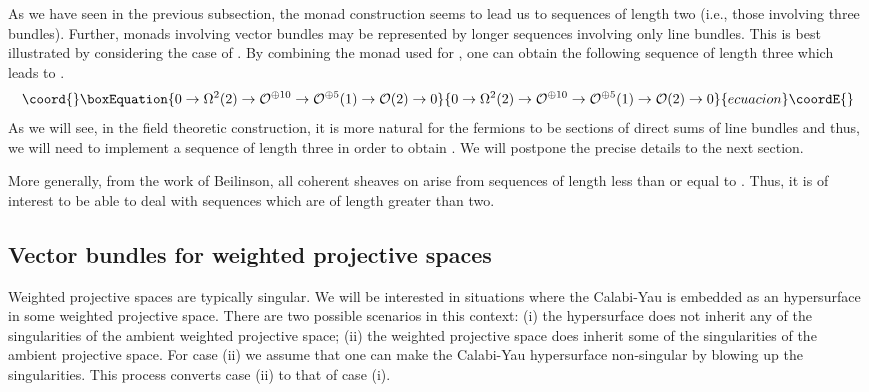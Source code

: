 \documentclass[a4paper,12pt]{article}
\begin{document}
As we have seen in the previous subsection, the monad construction
seems to lead us to sequences of length two (i.e., those involving
three bundles). Further, monads involving vector bundles may be
represented by longer sequences involving only line bundles. This is
best illustrated by considering the case of \coordHE{}. 
By combining the monad used for \coordHE{}, one can obtain
the following sequence of length three which leads to \coordHE{}.
\begin{equation}\coord{}\boxEquation{
0\rightarrow \Omega^{2}(2)
\rightarrow {\cal O}^{\oplus 10}\rightarrow
{\cal O}^{\oplus 5}(1)\rightarrow
{\cal O}(2)\rightarrow 0 
}{
0\rightarrow \Omega^{2}(2)
\rightarrow {\cal O}^{\oplus 10}\rightarrow
{\cal O}^{\oplus 5}(1)\rightarrow
{\cal O}(2)\rightarrow 0 
}{ecuacion}\coordE{}\end{equation}
As we will see, in the field theoretic construction, it is more natural
for the fermions to be sections of direct sums of line bundles and 
thus, we will need to implement a sequence of length three in order to
obtain \coordHE{}. We will postpone the precise details to the next
section.

More generally, from the work of Beilinson\cite{beilinson},
all coherent sheaves on
\coordHE{} arise from sequences of length less than or equal to \coordHE{}.
Thus, it is of interest to be able to deal with sequences which are of
length greater than two.

\subsection{Vector bundles for weighted projective spaces}
\label{secvbwpn}

Weighted projective spaces are typically singular. We will be interested
in situations where the Calabi-Yau is embedded as an hypersurface in
some weighted projective space. There are two possible scenarios in this
context: (i) the hypersurface does not inherit any of the singularities of 
the ambient weighted projective space; (ii) the weighted projective
space does inherit some of the singularities of the ambient projective
space. For case (ii) we assume that one can make the Calabi-Yau hypersurface
non-singular by blowing up the singularities. This process converts
case (ii) to that of case (i).
\end{document}
